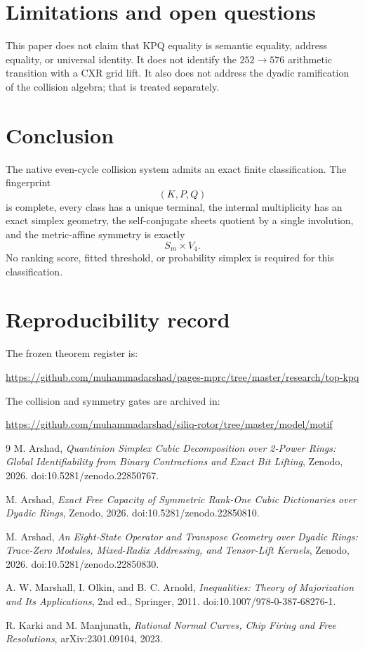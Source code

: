 \documentclass[11pt]{article}
\theoremstyle{definition}
\newcommand{\1}{\mathbf{1}}
\begin{document}
\section{Limitations and open questions}
This paper does not claim that KPQ equality is semantic equality, address equality, or universal identity. It does not identify the $252\to576$ arithmetic transition with a CXR grid lift. It also does not address the dyadic ramification of the collision algebra; that is treated separately.

\section{Conclusion}
The native even-cycle collision system admits an exact finite classification. The fingerprint
\[
(K,P,Q)
\]
is complete, every class has a unique terminal, the internal multiplicity has an exact simplex geometry, the self-conjugate sheets quotient by a single involution, and the metric-affine symmetry is exactly
\[
S_m\times V_4.
\]
No ranking score, fitted threshold, or probability simplex is required for this classification.

\section*{Reproducibility record}
The frozen theorem register is:
\begin{center}
\url{https://github.com/muhammadarshad/pages-mprc/tree/master/research/top-kpq}
\end{center}
The collision and symmetry gates are archived in:
\begin{center}
\url{https://github.com/muhammadarshad/siliq-rotor/tree/master/model/motif}
\end{center}

\begin{thebibliography}{9}
M. Arshad,
\emph{Quantinion Simplex Cubic Decomposition over 2-Power Rings: Global Identifiability from Binary Contractions and Exact Bit Lifting},
Zenodo, 2026.
doi:10.5281/zenodo.22850767.

M. Arshad,
\emph{Exact Free Capacity of Symmetric Rank-One Cubic Dictionaries over Dyadic Rings},
Zenodo, 2026.
doi:10.5281/zenodo.22850810.

M. Arshad,
\emph{An Eight-State Operator and Transpose Geometry over Dyadic Rings: Trace-Zero Modules, Mixed-Radix Addressing, and Tensor-Lift Kernels},
Zenodo, 2026.
doi:10.5281/zenodo.22850830.

A. W. Marshall, I. Olkin, and B. C. Arnold,
\emph{Inequalities: Theory of Majorization and Its Applications},
2nd ed., Springer, 2011.
doi:10.1007/978-0-387-68276-1.

R. Karki and M. Manjunath,
\emph{Rational Normal Curves, Chip Firing and Free Resolutions},
arXiv:2301.09104, 2023.
\end{thebibliography}
\end{document}
